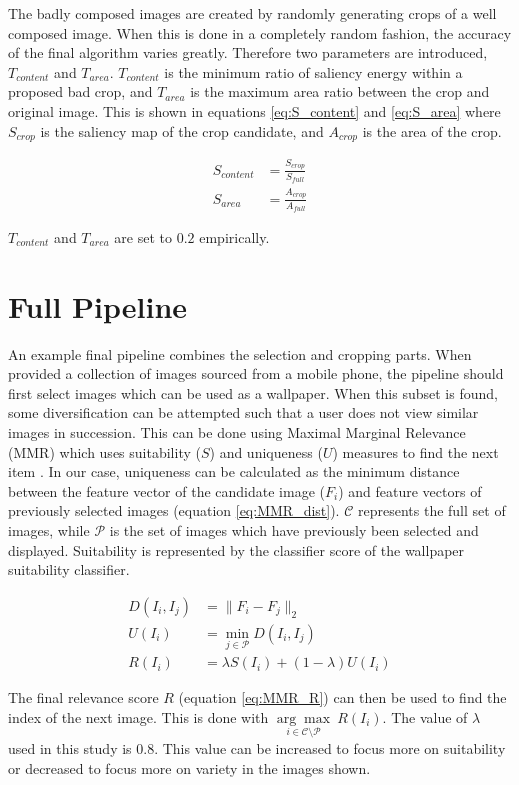 The badly composed images are created by randomly generating crops of a well
composed image.
When this is done in a completely random fashion, the accuracy of the final
algorithm varies greatly.
Therefore two parameters are introduced, $T_{content}$ and $T_{area}$.
$T_{content}$ is the minimum ratio of saliency energy within a proposed bad
crop, and $T_{area}$ is the maximum area ratio between the crop and original
image.
This is shown in equations \ref{eq:S_content} and \ref{eq:S_area} where
$S_{crop}$ is the saliency map of the crop candidate, and $A_{crop}$ is the area
of the crop.

\begin{align}
	S_{content} &= \frac{S_{crop}}{S_{full}}	\label{eq:S_content}\\
	S_{area}    &= \frac{A_{crop}}{A_{full}}	\label{eq:S_area}
\end{align}

$T_{content}$ and $T_{area}$ are set to $0.2$ empirically.


\section{Full Pipeline}

An example final pipeline combines the selection and cropping parts.
When provided a collection of images sourced from a mobile phone, the pipeline
should first select images which can be used as a wallpaper.
When this subset is found, some diversification can be attempted such that a
user does not view similar images in succession.
This can be done using Maximal Marginal Relevance (MMR) which uses suitability ($S$) and uniqueness ($U$) measures to find the next item \cite{carbonell1998use}.
In our case, uniqueness can be calculated as the minimum distance between the feature vector of the candidate image ($F_i$) and feature vectors of previously selected images (equation \ref{eq:MMR_dist}).
$\mathcal{C}$ represents the full set of images, while $\mathcal{P}$ is the set of images which have previously been selected and displayed.
Suitability is represented by the classifier score of the wallpaper suitability classifier.

\begin{align}
	D(I_i, I_j) &= \|F_i - F_j\|_2 \\
	U(I_i)      &= \min_{j\in\mathcal{P}}D(I_i,I_j) \label{eq:MMR_dist} \\
	R(I_i)      &= \lambda S(I_i) + (1-\lambda) U(I_i) \label{eq:MMR_R}
\end{align}

The final relevance score $R$ (equation \ref{eq:MMR_R}) can then be used to find the index of the next image.
This is done with $\underset{i\in\mathcal{C}\setminus\mathcal{P}}{\arg\max}\ R(I_i)$.
The value of $\lambda$ used in this study is $0.8$. This value can be increased to focus more on suitability or decreased to focus more on variety in the images shown.

